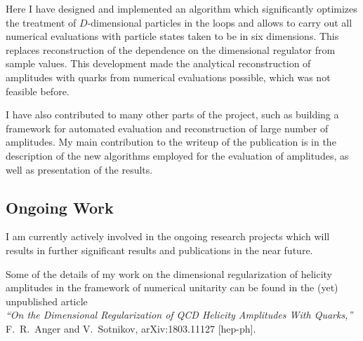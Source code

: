 \documentclass[a4paper,10pt]{article}
\begin{document}
  Here I have designed and implemented an algorithm which significantly optimizes the
  treatment of $D$-dimensional particles in the loops and allows to carry out all numerical
  evaluations with particle states taken to be in six dimensions. This replaces reconstruction
  of the dependence on the dimensional regulator from sample values.
  This development made the analytical reconstruction of amplitudes with quarks from numerical evaluations possible,
  which was not feasible before.

  I have also contributed to many other parts of the project, such as
  building a framework for automated evaluation and reconstruction of large number of amplitudes.
  My main contribution to the writeup of the publication is in the description of the new algorithms employed for the evaluation
  of amplitudes, as well as presentation of the results.


\subsection*{Ongoing Work}

I am currently actively involved in the ongoing research projects which will results in further significant results and publications in the near future.

Some of the details of my work on the dimensional regularization of helicity amplitudes in the framework of numerical unitarity can be found
in the (yet) unpublished article\\
\textit{``On the Dimensional Regularization of QCD Helicity Amplitudes With Quarks,''} F.~R.~Anger and V.~Sotnikov, arXiv:1803.11127 [hep-ph].
\end{document}
